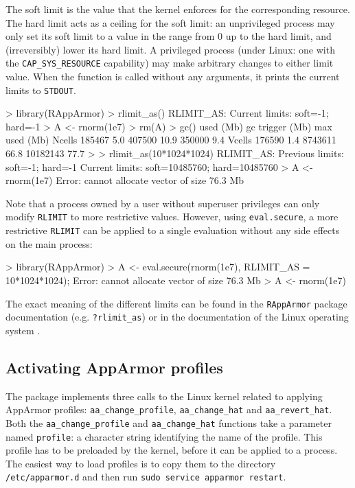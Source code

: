 \documentclass[article]{jss}
\begin{document}
The soft limit is the value that the kernel enforces for the corresponding
resource. The hard limit acts as a ceiling for the soft limit: an unprivileged
process may only set its soft limit to a value in the range from 0 up to the
hard limit, and (irreversibly) lower its hard limit. A  privileged process
(under  Linux:  one  with  the \texttt{CAP\_SYS\_RESOURCE} capability) may make
arbitrary changes to either limit value. When the function is called without any
arguments, it prints the current limits to \texttt{STDOUT}. \citep{linuxrlimit}

\begin{CodeChunk}
\begin{CodeInput}
> library(RAppArmor)
> rlimit_as()
RLIMIT_AS:
Current limits: soft=-1; hard=-1
> A <- rnorm(1e7)
> rm(A)
> gc()
         used (Mb) gc trigger (Mb) max used (Mb)
Ncells 185467  5.0     407500 10.9   350000  9.4
Vcells 176590  1.4    8743611 66.8 10182143 77.7
>
> rlimit_as(10*1024*1024)
RLIMIT_AS:
Previous limits: soft=-1; hard=-1
Current limits: soft=10485760; hard=10485760
> A <- rnorm(1e7)
Error: cannot allocate vector of size 76.3 Mb
\end{CodeInput}
\end{CodeChunk}

Note that a process owned by a user without superuser privileges can only modify
\texttt{RLIMIT} to more restrictive values. However, using \texttt{eval.secure},
a more restrictive \texttt{RLIMIT} can be applied to a single evaluation without
any side effects on the main process:

\begin{CodeChunk}
\begin{CodeInput}
> library(RAppArmor)
> A <- eval.secure(rnorm(1e7), RLIMIT_AS = 10*1024*1024);
Error: cannot allocate vector of size 76.3 Mb
> A <- rnorm(1e7)
\end{CodeInput}
\end{CodeChunk}

The exact meaning of the different limits can be found in the \texttt{RAppArmor}
package documentation (e.g. \texttt{?rlimit\_as}) or in the documentation of
the Linux operating system \citep{ubunturlimit}.

\subsection{Activating AppArmor profiles}

The  package implements three calls to the Linux kernel related
to applying AppArmor profiles: \texttt{aa\_change\_profile},
\texttt{aa\_change\_hat} and \texttt{aa\_revert\_hat}. Both the
\texttt{aa\_change\_profile} and \texttt{aa\_change\_hat} functions take a
parameter named \texttt{profile}: a character string identifying the name of
the profile. This profile has to be preloaded by the kernel, before it can be
applied to a process. The easiest way to load profiles is to copy them to the
directory \texttt{/etc/apparmor.d} and then run \texttt{sudo service apparmor
restart}.
\end{document}
